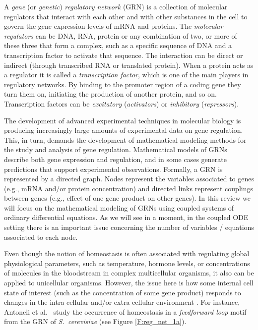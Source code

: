 \documentclass[a4paper,fleqn]{cas-dc}
\newcommand{\etal}{\textrm{et al.}}
\begin{document}
A {\em gene} (or {\em genetic}) {\em regulatory network} (GRN) is a collection of molecular regulators that interact with each other and with other substances in the cell to govern the gene expression levels of mRNA and proteins. 
The {\em molecular regulators} can be DNA, RNA, protein or any combination of two, or more of these three that form a complex, such as a specific sequence of DNA and a transcription factor to activate that sequence. 
The interaction can be direct or indirect (through transcribed RNA or translated protein).
When a protein acts as a regulator it is called a {\em transcription factor}, which is one of the main players in regulatory networks.  
By binding to the promoter region of a coding gene they turn them on, initiating the production of another protein, and so on. 
Transcription factors can be {\em excitatory} ({\em activators}) or {\em inhibitory} ({\em repressors}).

The development of advanced experimental techniques in molecular biology is producing increasingly large amounts of experimental data on gene regulation. 
This, in turn, demands the development of mathematical modeling methods for the study and analysis of gene regulation.
Mathematical models of GRNs describe both gene expression and regulation, and in some cases generate predictions that support experimental observations.
Formally, a GRN is represented by a directed graph.
Nodes represent the variables associated to genes (e.g., mRNA and/or protein concentration) and directed links represent couplings between genes (e.g., effect of one gene product on other genes).
In this review we will focus on the mathematical modeling of GRNs using coupled systems of ordinary differential equations.
As we will see in a moment, in the coupled ODE setting there is an important issue concerning the number of variables / equations associated to each node.

Even though the notion of homeostasis is often associated with regulating global physiological parameters, such as temperature, hormone levels, or concentrations of molecules in the bloodstream in complex multicellular organisms, it also can be applied to unicellular organisms.
However, the issue here is how some internal cell state of interest (such as the concentration of some gene product) responds to changes in the intra-cellular and/or extra-cellular environment \cite{ma2009,tang2016,shi2017}.
For instance, Antoneli \etal~\cite{antoneli2018} study the occurrence of homeostasis in a \emph{feedforward loop} motif from the GRN of \emph{S.~cerevisiae} (see Figure \ref{F:reg_net_1a}).
\end{document}
